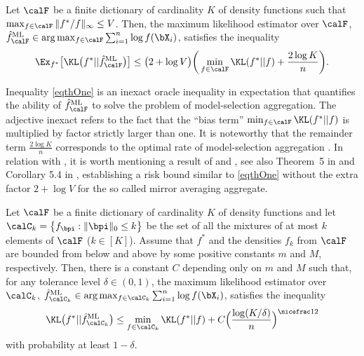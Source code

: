 \begin{theorem}\label{th:1}
Let $\calF$ be a finite dictionary of cardinality $K$ of density functions such that $\max_{f\in\calF}\|f^*/f\|_\infty\le V$. Then, the maximum likelihood estimator
over $\calF$, $\hat f^{\rm ML}_{\calF}\in{\rm arg}\max_{f\in\calF} \sum_{i=1}^n \log f(\bX_i)$, satisfies the inequality
\begin{equation}\label{eqthOne}
\Ex_{f^*}\big[\KL\big(f^*||\hat f^{\rm ML}_{\calF}\big)\big] \le \big(2+\log V\big)\bigg(\min_{f\in\calF} \KL(f^*|| f) + \frac{2\log K}{n}\bigg).
\end{equation}
\end{theorem}
Inequality \eqref{eqthOne} is an inexact oracle inequality in expectation that quantifies the ability of $\hat f^{\rm ML}_{\calF}$
to solve the problem of model-selection aggregation. The adjective inexact refers to the fact that the ``bias term'' $\min_{f\in\calF} \KL(f^*|| f)$
is multiplied by factor strictly larger than one. It is noteworthy that the remainder term $\frac{2\log K}{n}$ corresponds to the optimal rate
of model-selection aggregation \citep{Juditski00,Tsybakov03}. In relation with , it is worth mentioning a result of \citep{Yang2000} and \citep{Catoni97},
see also Theorem~5 in \citep{Lecue06} and Corollary 5.4 in \citep{JRT}, establishing a risk bound similar to \eqref{eqthOne} without the
extra factor $2+\log V$ for the so called mirror averaging aggregate.

\begin{theorem}\label{th:2}
Let $\calF$ be a finite dictionary of cardinality $K$ of density functions and let $\calC_k=\big\{f_{\bpi}:\|\bpi\|_0\le k\big\}$ be the set of all
the mixtures of at most $k$ elements of $\calF$ ($k\in[K]$). Assume that $f^*$ and the densities $f_k$ from $\calF$ are bounded from below and above
by some positive constants $m$ and $M$, respectively. Then, there is a constant $C$ depending only on $m$ and $M$ such that, for any tolerance level
$\delta\in(0,1)$, the maximum likelihood estimator
over $\calC_k$, $\hat f^{\rm ML}_{\calC_k}\in{\rm arg}\max_{f\in\calC_k} \sum_{i=1}^n \log f(\bX_i)$, satisfies the inequality
\begin{equation}
\KL\big(f^*||\hat f^{\rm ML}_{\calC_k}\big) \le \min_{f\in\calC_k} \KL(f^*|| f) + C\Big(\frac{\log(K/\delta)}{n}\Big)^{\nicefrac12}
\end{equation}
with probability at least $1-\delta$.
\end{theorem}

